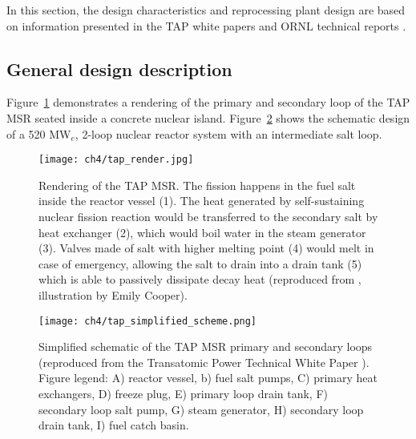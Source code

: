 In this section, the design characteristics and reprocessing plant design are 
based on information presented in the TAP white papers  
\cite{transatomic_power_corporation_technical_2016,
transatomic_power_corporation_neutronics_2016} and \gls{ORNL} technical 
reports \cite{betzler_two-dimensional_2017, betzler_assessment_2017-1}.

\subsection{General design description}

Figure~\ref{fig:tap-rendering} demonstrates a rendering of the primary and 
secondary loop of the \gls{TAP} \gls{MSR} seated inside a concrete nuclear 
island. Figure~\ref{fig:tap-primary-scheme} shows the schematic design of a 
520 MW$_{e}$, 2-loop nuclear reactor system with an intermediate salt loop.
\begin{figure}[h] %
	\centering
	\texttt{[image: ch4/tap\_render.jpg]}
	\caption{Rendering of the \gls{TAP} \gls{MSR}. The fission happens in the 
		fuel salt inside the reactor vessel (1). The heat generated by 
		self-sustaining nuclear fission reaction would be transferred to the 
		secondary salt by heat exchanger (2), which would boil water in the 
		steam 
		generator (3). Valves made of salt with higher melting point (4) would 
		melt in case of emergency, allowing the salt to drain into a drain 
		tank 
		(5) which is able to passively dissipate decay heat	(reproduced from 
		\cite{strickland_transatomic_2014}, illustration by Emily Cooper).}
	\label{fig:tap-rendering}
\end{figure}
\begin{figure}[h] %
	\centering
	\texttt{[image: ch4/tap\_simplified\_scheme.png]}
	\caption{Simplified schematic of the \gls{TAP} \gls{MSR} primary and  
		secondary loops (reproduced from the Transatomic Power Technical White 
		Paper \cite{transatomic_power_corporation_technical_2016}). Figure 
		legend: 
		A) reactor vessel, b) fuel salt pumps, C) primary heat exchangers, D) 
		freeze plug, E) primary loop drain tank, F) secondary loop salt pump, 
		G) 
		steam generator, H) secondary loop drain tank, I) fuel catch basin.}
	\label{fig:tap-primary-scheme}
\end{figure}

